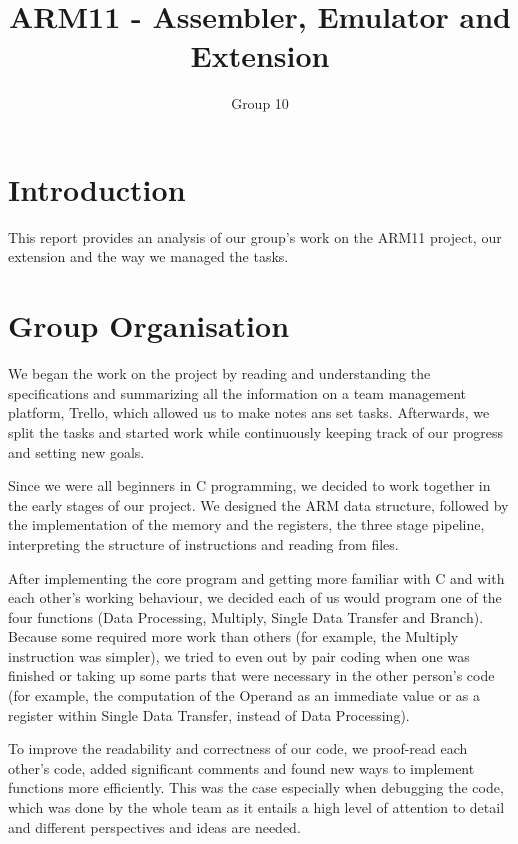 \documentclass[11pt]{article}
\begin{document}
\title{ARM11 - Assembler, Emulator and Extension}
\author{Group 10}

\maketitle

\section{Introduction}
This report provides an analysis of our group's work on the ARM11 project, our extension and the way we managed the tasks.

\section{Group Organisation}
We began the work on the project by reading and understanding the specifications and summarizing all the information on a team management platform, Trello, which allowed us to make notes ans set tasks. Afterwards, we split the tasks and started work while continuously keeping track of our progress and setting new goals.  \\ \par \noindent
Since we were all beginners in C programming, we decided to work together in the early stages of our project. We designed the ARM data structure, followed by the implementation of the memory and the registers, the three stage pipeline, interpreting the structure of instructions and reading from files. \\ \par \noindent
After implementing the core program and getting more familiar with C and with each other’s working behaviour, we decided each of us would program one of the four functions (Data Processing, Multiply, Single Data Transfer and Branch). Because some required more work than others (for example, the Multiply instruction was simpler), we tried to even out by pair coding when one was finished or taking up some parts that were necessary in the other person's code (for example, the computation of the Operand as an immediate value or as a register within Single Data Transfer, instead of Data Processing). \\ \par \noindent
To improve the readability and correctness of our code, we proof-read each other's code, added significant comments and found new ways to implement functions more efficiently. This was the case especially when debugging the code, which was done by the whole team as it entails a high level of attention to detail and different perspectives and ideas are needed. \\ \par \noindent
\end{document}
